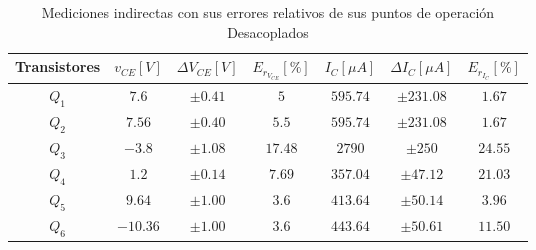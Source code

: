 \begin{enumerate}
\begin{itemize}
                \begin{table}[H]
                  \centering
                  \begin{tabular}{|c|c|c|c|c|c|c|}
                    \hline
                    \textbf{Transistores} & $v_{CE} [V]$ & $\Delta V_{CE} [V]$ & $E_{r_{V_{CE}}} [\%]$ & $I_{C} [\mu A]$ & $\Delta I_{C} [\mu A]$ & $E_{r_{I_{C}}} [\%]$ \\
                    \hline
                    $Q_1$                 & $7.6$        & $\pm 0.41 $         & $5$                   & $595.74$        & $\pm 231.08$           & $1.67$               \\
                    \hline
                    $Q_2$                 & $7.56$       & $\pm 0.40 $         & $5.5$                 & $595.74$        & $\pm 231.08$           & $1.67$               \\
                    \hline
                    $Q_3$                 & $-3.8$       & $\pm 1.08$          & $17.48$               & $2790$          & $\pm 250$              & $24.55$              \\
                    \hline
                    $Q_4$                 & $1.2$        & $\pm 0.14$          & $7.69$                & $357.04$        & $\pm 47.12$            & $21.03$              \\
                    \hline
                    $Q_5$                 & $9.64$       & $\pm 1.00$          & $3.6$                 & $413.64$        & $\pm 50.14$            & $3.96$               \\
                    \hline
                    $Q_6$                 & $-10.36$     & $\pm 1.00$          & $3.6$                 & $443.64$        & $\pm 50.61$            & $11.50$              \\
                    \hline
                  \end{tabular}
                  \caption{Mediciones indirectas con sus errores relativos de sus puntos de operación Desacoplados}
                  \label{tab:puntos_operacion_experimental_maserror_parte3_des}
                \end{table}
        \end{itemize}


\end{enumerate}
